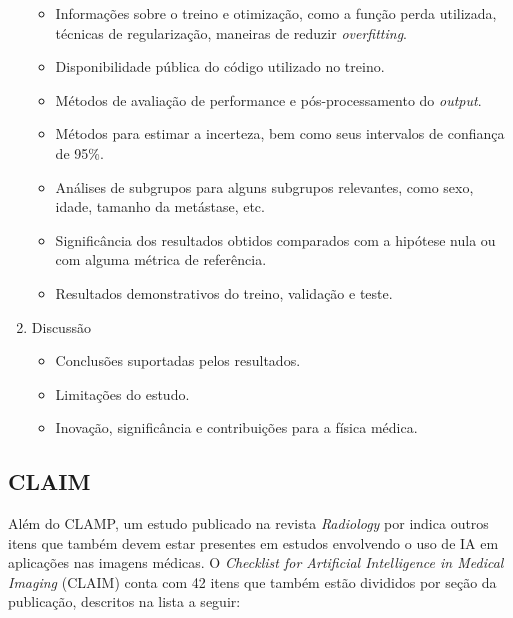 \begin{enumerate}
\begin{itemize}
        \item Informações sobre o treino e otimização, como a função perda utilizada, técnicas de regularização, maneiras de reduzir \textit{overfitting}.
        \item Disponibilidade pública do código utilizado no treino.
        \item Métodos de avaliação de performance e pós-processamento do \textit{output}.
        \item Métodos para estimar a incerteza, bem como seus intervalos de confiança de 95\%.
        \item Análises de subgrupos para alguns subgrupos relevantes, como sexo, idade, tamanho da metástase, etc.
        \item Significância dos resultados obtidos comparados com a hipótese nula ou com alguma métrica de referência.
        \item Resultados demonstrativos do treino, validação e teste.
    \end{itemize}
    \item Discussão
    \begin{itemize}
        \item Conclusões suportadas pelos resultados.
        \item Limitações do estudo.
        \item Inovação, significância e contribuições para a física médica.
    \end{itemize}
\end{enumerate}


\subsection{CLAIM}

Além do CLAMP, um estudo publicado na revista \textit{Radiology} por \cite{Mongan:2020} indica outros itens que também devem estar presentes em estudos envolvendo o uso de IA em aplicações nas imagens médicas. O \textit{Checklist for Artificial Intelligence in Medical Imaging} (CLAIM) conta com 42 itens que também estão divididos por seção da publicação, descritos na lista a seguir:

